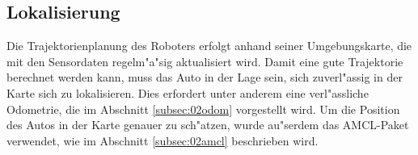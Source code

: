 \subsection{Lokalisierung}
\label{subsec:02lokalisierung}

Die Trajektorienplanung des Roboters erfolgt anhand seiner Umgebungskarte, die mit den Sensordaten regelm"a"sig aktualisiert wird. Damit eine gute Trajektorie berechnet werden kann, muss das Auto in der Lage sein, sich zuverl"assig in der Karte sich zu lokalisieren. Dies erfordert unter anderem eine verl"assliche Odometrie, die im Abschnitt \ref{subsec:02odom} vorgestellt wird. Um die Position des Autos in der Karte genauer zu sch"atzen, wurde au"serdem das AMCL-Paket verwendet, wie im Abschnitt \ref{subsec:02amcl} beschrieben wird.


